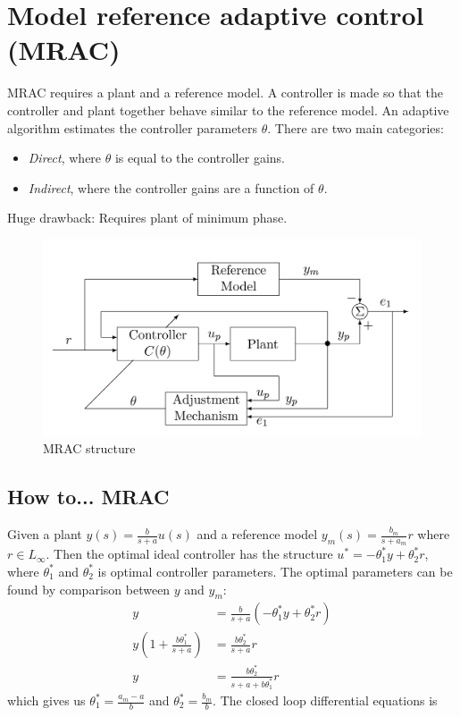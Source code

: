 \section{Model reference adaptive control (MRAC)}
MRAC requires a plant and a reference model. A controller is made so that the controller and plant together behave similar to the reference model. An adaptive algorithm estimates the controller parameters $\theta$. There are two main categories:
\begin{itemize}
	\item \emph{Direct}, where $\theta$ is equal to the controller gains.
	\item \emph{Indirect}, where the controller gains are a function of $\theta$.
\end{itemize}
Huge drawback: Requires plant of minimum phase.

\begin{figure}[ht!]
\begin{center}
\includegraphics[width = \textwidth]{MRAC}
\caption{MRAC structure}
\label{fig:MRAC}
\end{center}
\end{figure}

\subsection{How to... MRAC}
Given a plant $y(s) = \frac{b}{s+a}u(s)$ and a reference model $y_m(s) = \frac{b_m}{s+a_m}r$ where $r \in L_\infty$.
Then the optimal ideal controller has the structure $u^* = -\theta_1^* y + \theta_2^* r$, where $\theta_1^*$ and $\theta_2^*$ is optimal controller parameters. The optimal parameters can be found by comparison between $y$ and $y_m$:
\begin{equation}
\begin{split}
y &= \frac{b}{s+a}(-\theta_1^* y + \theta_2^* r) \\
y(1+\frac{b\theta_1^*}{s+a} ) &= \frac{b\theta_2^*}{s+a}r \\
y &= \frac{b\theta_2^*}{s+a+b\theta_1^*}r
\end{split}
\end{equation}
which gives us $\theta_1^* = \frac{a_m-a}{b}$ and $\theta_2^* = \frac{b_m}{b}$. The closed loop differential equations is

